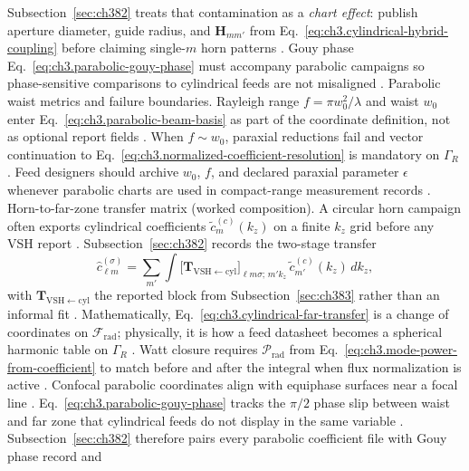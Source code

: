 Subsection~\ref{sec:ch382} treats that contamination as a \emph{chart effect}: publish aperture diameter, guide radius, and \(\mathbf{H}_{m m'}\) from
Eq.~\eqref{eq:ch3.cylindrical-hybrid-coupling} before claiming single-\(m\) horn patterns \cite{jackson1999}. Gouy phase
Eq.~\eqref{eq:ch3.parabolic-gouy-phase} must accompany parabolic campaigns so phase-sensitive comparisons to cylindrical feeds are not misaligned
\cite{allen1992}.
Parabolic waist metrics and failure boundaries. Rayleigh range \(f=\pi w_{0}^{2}/\lambda\) and waist \(w_{0}\) enter Eq.~\eqref{eq:ch3.parabolic-beam-basis} as part of the coordinate definition, not as optional report fields
\cite{jackson1999}. When \(f\sim w_{0}\), paraxial reductions fail and vector continuation to
Eq.~\eqref{eq:ch3.normalized-coefficient-resolution} is mandatory on \(\Gamma_R\) \cite{allen1992}. Feed designers should
archive \(w_{0}\), \(f\), and declared paraxial parameter \(\epsilon\) whenever parabolic charts are used in compact-range measurement records
\cite{harrington2001}.
Horn-to-far-zone transfer matrix (worked composition). A circular horn campaign often exports cylindrical coefficients \(\widetilde{c}_{m}^{(c)}(k_{z})\) on a finite \(k_{z}\) grid before any VSH report
\cite{stratton1941}. Subsection~\ref{sec:ch382} records the two-stage transfer
\begin{equation}
\label{eq:ch3.cylindrical-far-transfer}
\widehat{c}_{\ell m}^{(\sigma)}
=
\sum_{m'}\int
\bigl[\mathbf{T}_{\mathrm{VSH}\leftarrow\mathrm{cyl}}\bigr]_{\ell m\sigma;\,m'k_{z}}\,
\widetilde{c}_{m'}^{(c)}(k_{z})\,dk_{z},
\end{equation}
with \(\mathbf{T}_{\mathrm{VSH}\leftarrow\mathrm{cyl}}\) the reported block from Subsection~\ref{sec:ch383} rather than an informal fit
\cite{hansen1988}. Mathematically, Eq.~\eqref{eq:ch3.cylindrical-far-transfer} is a change of coordinates on
\(\mathcal{F}_{\mathrm{rad}}\); physically, it is how a feed datasheet becomes a spherical harmonic table on \(\Gamma_R\)
\cite{jackson1999}. Watt closure requires \(\mathcal{P}_{\mathrm{rad}}\) from Eq.~\eqref{eq:ch3.mode-power-from-coefficient} to match
before and after the integral when flux normalization is active \cite{poynting1884}.
Confocal parabolic coordinates align with equiphase surfaces near a focal line \cite{stratton1941}. Eq.~\eqref{eq:ch3.parabolic-gouy-phase}
tracks the \(\pi/2\) phase slip between waist and far zone that cylindrical feeds do not display in the same variable
\cite{allen1992}. Subsection~\ref{sec:ch382} therefore pairs every parabolic coefficient file with Gouy phase record and
